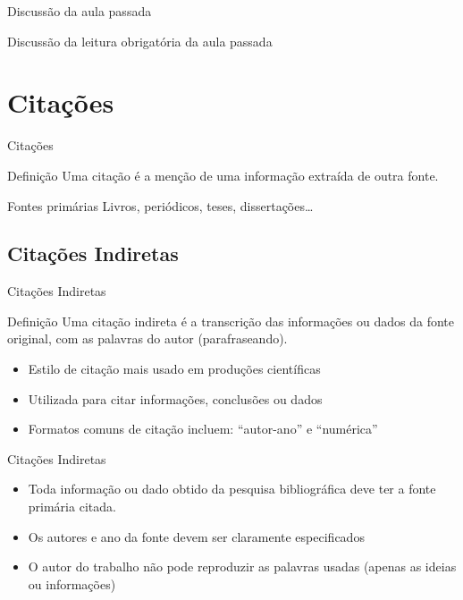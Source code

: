 \documentclass{beamer}
\begin{document}

\begin{frame}{Discussão da aula passada}
  \begin{block}{}
    \footnotesize
    Discussão da leitura obrigatória da aula passada
  \end{block}
\end{frame}

\section{Citações}

\begin{frame}{Citações}
  \begin{block}{Definição}
    \footnotesize
    Uma citação é a menção de uma informação extraída de outra fonte.
  \end{block}
  \bigskip
  \begin{exampleblock}{Fontes primárias}
    \footnotesize
    Livros, periódicos, teses, dissertações\ldots
  \end{exampleblock}
\end{frame}

\subsection{Citações Indiretas}

\begin{frame}{Citações Indiretas}
  \begin{block}{Definição}
    \footnotesize
    Uma citação indireta é a transcrição das informações ou dados da
    fonte original, com as palavras do autor (parafraseando).
  \end{block}
  \bigskip
  \begin{itemize}
    \scriptsize
  \item Estilo de citação mais usado em produções científicas
  \item Utilizada para citar informações, conclusões ou dados
  \item Formatos comuns de citação incluem: ``autor-ano'' e
    ``numérica''
  \end{itemize}
\end{frame}

\begin{frame}{Citações Indiretas}
  \begin{itemize}
    \footnotesize
  \item \alert{Toda} informação ou dado obtido da pesquisa
    bibliográfica \alert{deve} ter a fonte primária citada.
    \bigskip
  \item Os autores e ano da fonte devem ser claramente especificados
    \bigskip
  \item O autor do trabalho \alert{não pode} reproduzir as palavras
    usadas (apenas as ideias ou informações)
  \end{itemize}
\end{frame}
\end{document}
